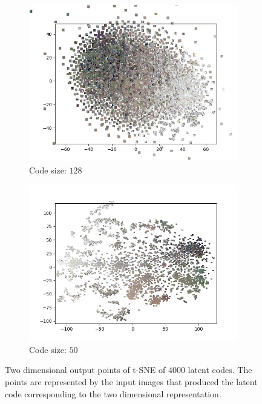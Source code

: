 \begin{figure}[H]
\begin{subfigure}{.5\textwidth}
        \centering
        \includegraphics[width=\textwidth]{images/figures/experiments_latent/pooling_dim1024_images.png}   
        \caption{Code size: $128$}
    \end{subfigure}%
    \begin{subfigure}{.5\textwidth}
        \centering
        \includegraphics[width=\textwidth]{images/figures/experiments_latent/pooling_dim50_images.png}
        \caption{Code size: $50$}
    \end{subfigure}
    \caption{Two dimensional output points of t-SNE of $4000$ latent codes. The points are represented by the input
    images that produced the latent code corresponding to the two dimensional representation.}
\end{figure}